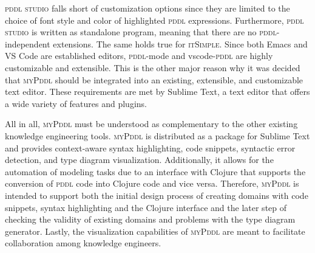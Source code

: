 \documentclass[runningheads]{llncs}
\newcommand{\mypddl}{\textsc{myPddl}\xspace}
\newcommand{\pddlstudio}{\textsc{pddl studio}\xspace}
\newcommand{\itsimple}{\textsc{itSimple}\xspace}
\newcommand{\pddlmode}{\textsc{pddl}-mode\xspace}
\newcommand{\vscode}{vscode-\textsc{pddl}\xspace}
\newcommand{\pddl}{\textsc{pddl}\xspace}
\begin{document}
\pddlstudio falls short of customization options since they are
limited to the choice of font style and color of highlighted \pddl
expressions. Furthermore, \pddlstudio is written as standalone
program, meaning that there are no \pddl-independent extensions. The
same holds true for \itsimple. Since both Emacs and VS Code are
established editors, \pddlmode and \vscode are highly customizable and
extensible. This is the other major reason why it was decided that
\mypddl should be integrated into an existing, extensible, and
customizable text editor. These requirements are met by Sublime Text,
a text editor that offers a wide variety of features and plugins.

All in all, \mypddl must be understood as complementary to the other
existing knowledge engineering tools. \mypddl is distributed as a
package for Sublime Text and provides context-aware syntax
highlighting, code snippets, syntactic error detection, and type
diagram visualization. Additionally, it allows for the automation of
modeling tasks due to an interface with Clojure that supports the
conversion of \textsc{pddl} code into Clojure code and vice
versa. Therefore, \mypddl is intended to support both the initial
design process of creating domains with code snippets, syntax
highlighting and the Clojure interface and the later step of checking
the validity of existing domains and problems with the type diagram
generator. Lastly, the visualization capabilities of \mypddl are meant
to facilitate collaboration among knowledge engineers.
\end{document}
